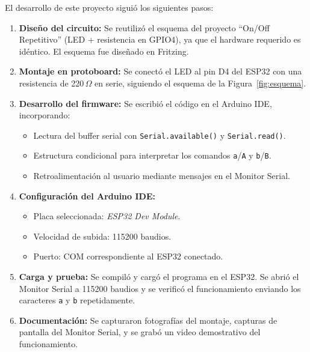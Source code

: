 \documentclass[12pt,a4paper]{article}
\begin{document}
El desarrollo de este proyecto siguió los siguientes pasos:

\begin{enumerate}
    \item \textbf{Diseño del circuito:} Se reutilizó el esquema del proyecto ``On/Off Repetitivo'' (LED + resistencia en GPIO4), ya que el hardware requerido es idéntico. El esquema fue diseñado en Fritzing.
    
    \item \textbf{Montaje en protoboard:} Se conectó el LED al pin D4 del ESP32 con una resistencia de 220\,$\Omega$ en serie, siguiendo el esquema de la Figura~\ref{fig:esquema}.
    
    \item \textbf{Desarrollo del firmware:} Se escribió el código en el Arduino IDE, incorporando:
    \begin{itemize}
        \item Lectura del buffer serial con \texttt{Serial.available()} y \texttt{Serial.read()}.
        \item Estructura condicional para interpretar los comandos \texttt{a}/\texttt{A} y \texttt{b}/\texttt{B}.
        \item Retroalimentación al usuario mediante mensajes en el Monitor Serial.
    \end{itemize}
    
    \item \textbf{Configuración del Arduino IDE:}
    \begin{itemize}
        \item Placa seleccionada: \textit{ESP32 Dev Module}.
        \item Velocidad de subida: 115200 baudios.
        \item Puerto: COM correspondiente al ESP32 conectado.
    \end{itemize}
    
    \item \textbf{Carga y prueba:} Se compiló y cargó el programa en el ESP32. Se abrió el Monitor Serial a 115200 baudios y se verificó el funcionamiento enviando los caracteres \texttt{a} y \texttt{b} repetidamente.
    
    \item \textbf{Documentación:} Se capturaron fotografías del montaje, capturas de pantalla del Monitor Serial, y se grabó un video demostrativo del funcionamiento.
\end{enumerate}

\end{document}
